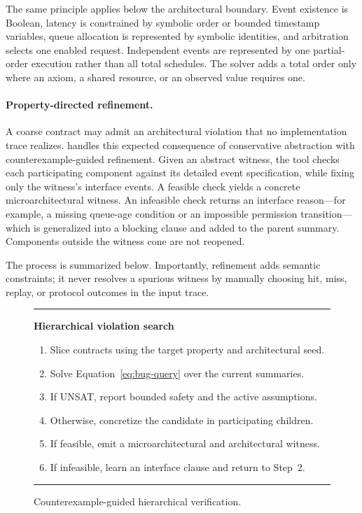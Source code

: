 The same principle applies below the architectural boundary.  Event existence
is Boolean, latency is constrained by symbolic order or bounded timestamp
variables, queue allocation is represented by symbolic identities, and
arbitration selects one enabled request.  Independent events are represented
by one partial-order execution rather than all total schedules.  The solver
adds a total order only where an axiom, a shared resource, or an observed value
requires one.

\paragraph{Property-directed refinement.}
A coarse contract may admit an architectural violation that no implementation
trace realizes.  \sys{} handles this expected consequence of conservative
abstraction with counterexample-guided refinement.  Given an abstract witness,
the tool checks each participating component against its detailed event
specification, while fixing only the witness's interface events.  A feasible
check yields a concrete microarchitectural witness.  An infeasible check
returns an interface reason---for example, a missing queue-age condition or an
impossible permission transition---which is generalized into a blocking
clause and added to the parent summary.  Components outside the witness cone
are not reopened.

The process is summarized below.  Importantly, refinement adds semantic
constraints; it never resolves a spurious witness by manually choosing hit,
miss, replay, or protocol outcomes in the input trace.

\begin{figure}[t]
  \small
  \hrule
  \vspace{3pt}
  \textbf{Hierarchical violation search}
  \begin{enumerate}
    \setlength{\itemsep}{0pt}
    \setlength{\parsep}{0pt}
    \item Slice contracts using the target property and architectural seed.
    \item Solve Equation~\ref{eq:bug-query} over the current summaries.
    \item If UNSAT, report bounded safety and the active assumptions.
    \item Otherwise, concretize the candidate in participating children.
    \item If feasible, emit a microarchitectural and architectural witness.
    \item If infeasible, learn an interface clause and return to Step~2.
  \end{enumerate}
  \vspace{-2pt}
  \hrule
  \caption{Counterexample-guided hierarchical verification.}
  \label{fig:search}
\end{figure}

